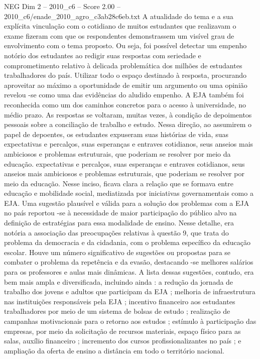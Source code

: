 \begin{textsample}{NEG Dim 2 – 2010\_c6 – Score 2.00 – 2010\_c6/enade\_2010\_agro\_c3ab28c6eb.txt}
A atualidade do tema e a sua explícita vinculação com o cotidiano de muitos estudantes que realizavam o exame fizeram com que os respondentes demonstrassem um visível grau de envolvimento com o tema proposto.
Ou seja, foi possível detectar um empenho notório dos estudantes ao redigir suas respostas com seriedade e comprometimento relativo à delicada problemática dos milhões de estudantes trabalhadores do país.
Utilizar todo o espaço destinado à resposta, procurando aproveitar ao máximo a oportunidade de emitir um argumento ou uma opinião revelou -se como uma das evidências do aludido empenho.
A EJA também foi reconhecida como um dos caminhos concretos para o acesso à universidade, no médio prazo.
As respostas se voltaram, muitas vezes, à condição de depoimentos pessoais sobre a conciliação de trabalho e estudo.
Nessa direção, ao assumirem o papel de depoentes, os estudantes expuseram suas histórias de vida, suas expectativas e percalços, suas esperanças e entraves cotidianos, seus anseios mais ambiciosos e problemas estruturais, que poderiam se resolver por meio da educação. expectativas e percalços, suas esperanças e entraves cotidianos, seus anseios mais ambiciosos e problemas estruturais, que poderiam se resolver por meio da educação.
Nesse inciso, ficava clara a relação que se formava entre educação e mobilidade social, mediatizada por iniciativas governamentais como a EJA.
Uma sugestão plausível e válida para a solução dos problemas com a EJA no país reportou -se à necessidade de maior participação do público alvo na definição de estratégias para essa modalidade de ensino.
Nesse detalhe, era notória a associação das preocupações relativas à questão 9, que trata do problema da democracia e da cidadania, com o problema específico da educação escolar.
Houve um número significativo de sugestões ou propostas para se combater o problema da repetência e da evasão, destacando -se melhores salários para os professores e aulas mais dinâmicas.
A lista dessas sugestões, contudo, era bem mais ampla e diversificada, incluindo ainda : a redução da jornada de trabalho dos jovens e adultos que participam da EJA ; melhoria de infraestrutura nas instituições responsáveis pela EJA ; incentivo financeiro aos estudantes trabalhadores por meio de um sistema de bolsas de estudo ; realização de campanhas motivacionais para o retorno aos estudos ; estímulo à participação das empresas, por meio da solicitação de recursos materiais, espaço físico para as salas, auxílio financeiro ; incremento dos cursos profissionalizantes no país ; e ampliação da oferta de ensino a distância em todo o território nacional.

\end{textsample}
